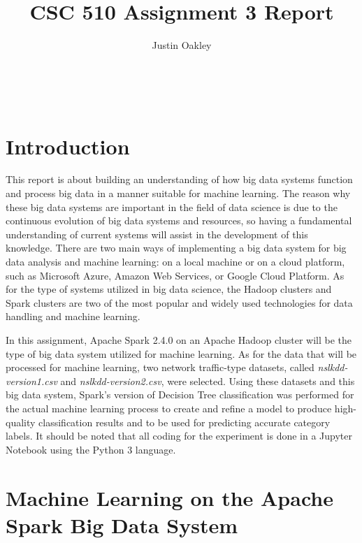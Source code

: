 \documentclass[a4paper,12pt]{IEEEtran}
\begin{document}
\title{CSC 510 Assignment 3 Report}
\author{Justin Oakley}
\maketitle\

\tableofcontents
\newpage

\section{Introduction}
This report is about building an understanding of how big data systems function and process big data in a manner suitable for machine learning. The reason why these big data systems are important in the field of data science is due to the continuous evolution of big data systems and resources, so having a fundamental understanding of current systems will assist in the development of this knowledge. There are two main ways of implementing a big data system for big data analysis and machine learning: on a local machine or on a cloud platform, such as Microsoft Azure, Amazon Web Services, or Google Cloud Platform. As for the type of systems utilized in big data science, the Hadoop clusters and Spark clusters are two of the most popular and widely used technologies for data handling and machine learning.

In this assignment, Apache Spark 2.4.0 on an Apache Hadoop cluster will be the type of big data system utilized for machine learning. As for the data that will be processed for machine learning, two network traffic-type datasets, called \textit{nslkdd-version1.csv} and \textit{nslkdd-version2.csv}, were selected. Using these datasets and this big data system, Spark's version of Decision Tree classification was performed for the actual machine learning process to create and refine a model to produce high-quality classification results and to be used for predicting accurate category labels. It should be noted that all coding for the experiment is done in a Jupyter Notebook using the Python 3 language.

\section{Machine Learning on the Apache Spark Big Data System}
\end{document}
